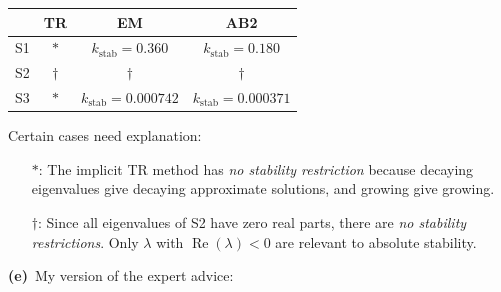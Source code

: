 \documentclass[11pt]{amsart}
\newcommand{\prob}[1]{\bigskip\noindent\textbf{#1}\, }
\newcommand{\kstab}{k_{\text{stab}}}
\begin{document}
\bigskip
\begin{center}
\begin{tabular}{r|c|c|c}
   & \phantom{sdljf} TR \phantom{sdljf} & \phantom{sdljf} EM \phantom{sdljf} & \phantom{sdljf} AB2 \phantom{sdljf} \\ \hline
S1 & $\ast$ & $\kstab = 0.360$ & $\kstab = 0.180$\\ \hline
S2 & $\dagger$ & $\dagger$ & $\dagger$ \\ \hline
S3 & $\ast$ & $\kstab = 0.000742$ & $\kstab = 0.000371$
\end{tabular}
\end{center}

\bigskip
Certain cases need explanation:
\begin{itemize}
\item[$\ast$:]     The implicit TR method has \emph{no stability restriction} because decaying eigenvalues give decaying approximate solutions, and growing give growing.
\item[$\dagger$:]  Since all eigenvalues of S2 have zero real parts, there are \emph{no stability restrictions}.  Only $\lambda$ with $\operatorname{Re}(\lambda) < 0$ are relevant to absolute stability.
\end{itemize}

\prob{(e)}  My version of the expert advice:
\end{document}
